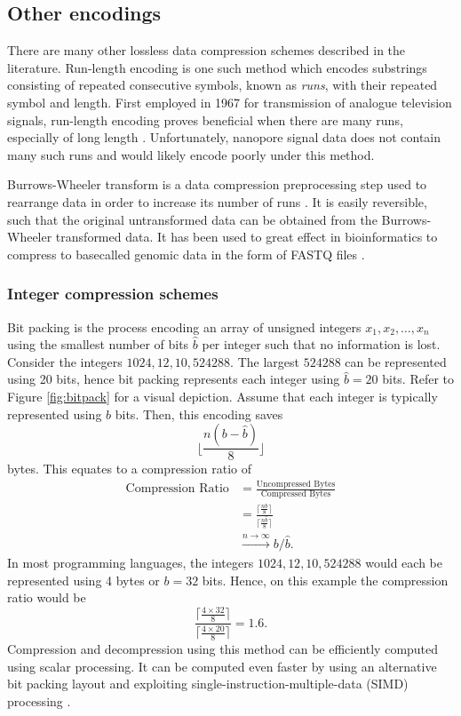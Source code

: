 \subsection{Other encodings}
\label{sec:data-other}

There are many other lossless data compression schemes described in the literature. Run-length encoding is one such method which encodes substrings consisting of repeated consecutive symbols, known as \textit{runs}, with their repeated symbol and length. First employed in 1967 for transmission of analogue television signals, run-length encoding proves beneficial when there are many runs, especially of long length \cite{rle}. Unfortunately, nanopore signal data does not contain many such runs and would likely encode poorly under this method.

Burrows-Wheeler transform is a data compression preprocessing step used to rearrange data in order to increase its number of runs \cite{bwt}. It is easily reversible, such that the original untransformed data can be obtained from the Burrows-Wheeler transformed data. It has been used to great effect in bioinformatics to compress to basecalled genomic data in the form of FASTQ files \cite{bwt-genomic}.

\subsubsection{Integer compression schemes}
\label{sec:integer-comp}

Bit packing is the process encoding an array of unsigned integers $x_1, x_2, \dots, x_n$
using the smallest number of bits $\hat b$ per integer such that no information is lost.
Consider the integers $1024,12,10,\num{524288}$. The largest $\num{524288}$ can be represented using 20 bits, hence bit packing represents each integer using $\hat b = 20$ bits. Refer to Figure \ref{fig:bitpack} for a visual depiction.
Assume that each integer is typically represented using $b$ bits.
Then, this encoding saves
\[\lfloor \frac{n(b-\hat b)}{8}\rfloor\]
bytes. This equates to a compression ratio of
\begin{align*}
	\text{Compression Ratio} &= \frac{\text{Uncompressed Bytes}}{\text{Compressed Bytes}}\\
	&= \frac{\lceil \frac{nb}{8}\rceil}{\lceil \frac{n\hat b}{8}\rceil}\\
	&\stackrel{n\to\infty}{\longrightarrow}b/\hat b.
\end{align*}
In most programming languages, the integers $1024,12,10,\num{524288}$ would each be represented using 4 bytes or $b=32$ bits.
Hence, on this example the compression ratio would be
\[\frac{\lceil \frac{4 \times 32}{8}\rceil}{\lceil \frac{4 \times 20}{8}\rceil} = 1.6.\]
Compression and decompression using this method can be efficiently computed using scalar processing.
It can be computed even faster by using an alternative bit packing layout and exploiting single-instruction-multiple-data (SIMD) processing  \cite{lemire-simd}.

